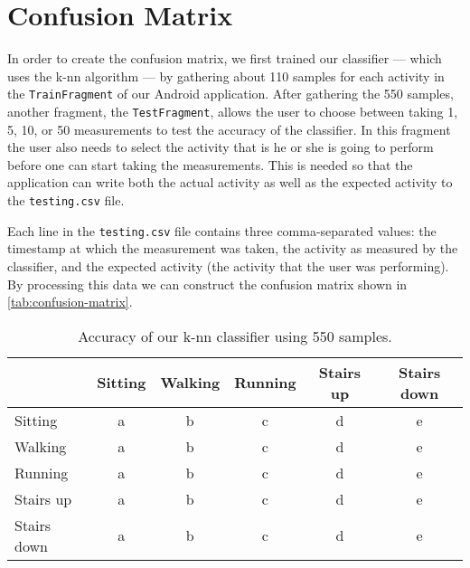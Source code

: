 \section{Confusion Matrix}
\label{sec:confusion-matrix}
In order to create the confusion matrix, we first trained our classifier --- which uses the k-nn algorithm --- by gathering about 110 samples for each activity in the \texttt{TrainFragment} of our Android application. After gathering the 550 samples, another fragment, the \texttt{TestFragment}, allows the user to choose between taking 1, 5, 10, or 50 measurements to test the accuracy of the classifier. In this fragment the user also needs to select the activity that is he or she is going to perform before one can start taking the measurements. This is needed so that the application can write both the actual activity as well as the expected activity to the \texttt{testing.csv} file.

Each line in the \texttt{testing.csv} file contains three comma-separated values: the timestamp at which the measurement was taken, the activity as measured by the classifier, and the expected activity (the activity that the user was performing). By processing this data we can construct the confusion matrix shown in \autoref{tab:confusion-matrix}.

\begin{table}[ht]
\centering
\caption{Accuracy of our k-nn classifier using 550 samples.}
\begin{tabular}{lccccc}
\toprule
 & Sitting & Walking & Running & Stairs up & Stairs down\\
\midrule
Sitting & a & b & c & d & e\\
Walking & a & b & c & d & e\\
Running & a & b & c & d & e\\
Stairs up & a & b & c & d & e\\
Stairs down & a & b & c & d & e\\
\bottomrule
\end{tabular}
\label{tab:confusion-matrix}
\end{table}
